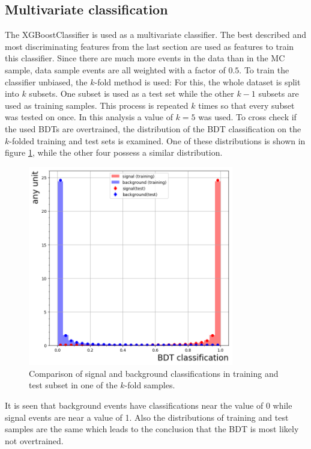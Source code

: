 \subsection{Multivariate classification}
The XGBoostClassifier \cite{XGB} is used as a multivariate classifier.
The best described and most discriminating features from the last section are used as features to train this classifier.
Since there are much more events in the data than in the MC sample, data sample events are all weighted with a factor of $0.5$.
To train the classifier unbiased, the $k$-fold method is used:
For this, the whole dataset is split into $k$ subsets.
One subset is used as a test set while the other $k-1$ subsets are used as training samples.
This process is repeated $k$ times so that every subset was tested on once.
In this analysis a value of $k=5$ was used.
To cross check if the used BDTs are overtrained, the distribution of the BDT classification on the $k$-folded training and test sets is examined.
One of these distributions is shown in figure \ref{fig:TrainTest}, while the other four possess a similar distribution.
\begin{figure}[!htb]
  \centering
  \includegraphics[width=0.8\textwidth]{plots/TrainTest.png}
  \caption{Comparison of signal and background classifications in training and test subset in one of the $k$-fold samples.}
  \label{fig:TrainTest}
\end{figure}
It is seen that background events have classifications near the value of 0 while signal events are near a value of 1.
Also the distributions of training and test samples are the same which leads to the conclusion that the BDT is most likely not overtrained.

